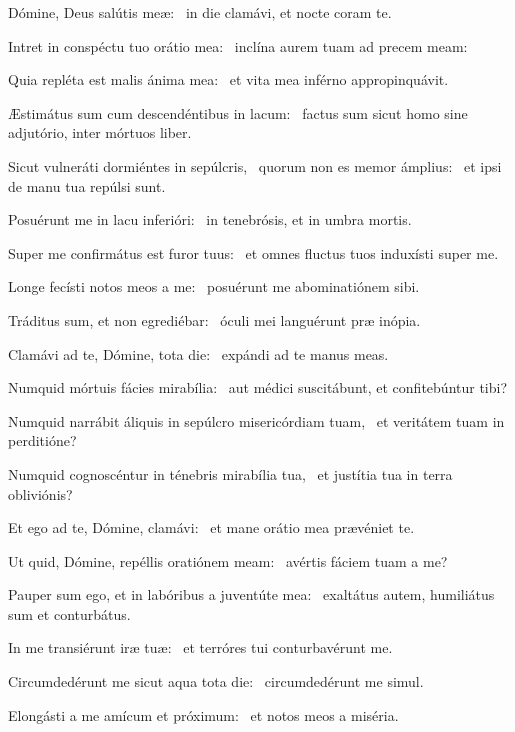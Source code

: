 \item Dómine, Deus salútis meæ:~\psstar{} in die clamávi, et nocte coram te.

\item Intret in conspéctu tuo orátio mea:~\psstar{} inclína aurem tuam ad precem meam:

\item Quia repléta est malis ánima mea:~\psstar{} et vita mea inférno appropinquávit.

\item Æstimátus sum cum descendéntibus in lacum:~\psstar{} factus sum sicut homo sine adjutório, inter mórtuos liber.

\item Sicut vulneráti dormiéntes in sepúlcris,~\pscross{} quorum non es memor ámplius:~\psstar{} et ipsi de manu tua repúlsi sunt.

\item Posuérunt me in lacu inferióri:~\psstar{} in tenebrósis, et in umbra mortis.

\item Super me confirmátus est furor tuus:~\psstar{} et omnes fluctus tuos induxísti super me.

\item Longe fecísti notos meos a me:~\psstar{} posuérunt me abominatiónem sibi.

\item Tráditus sum, et non egrediébar:~\psstar{} óculi mei languérunt præ inópia.

\item Clamávi ad te, Dómine, tota die:~\psstar{} expándi ad te manus meas.

\item Numquid mórtuis fácies mirabília:~\psstar{} aut médici suscitábunt, et confitebúntur tibi?

\item Numquid narrábit áliquis in sepúlcro misericórdiam tuam,~\psstar{} et veritátem tuam in perditióne?

\item Numquid cognoscéntur in ténebris mirabília tua,~\psstar{} et justítia tua in terra obliviónis?

\item Et ego ad te, Dómine, clamávi:~\psstar{} et mane orátio mea prævéniet te.

\item Ut quid, Dómine, repéllis oratiónem meam:~\psstar{} avértis fáciem tuam a me?

\item Pauper sum ego, et in labóribus a juventúte mea:~\psstar{} exaltátus autem, humiliátus sum et conturbátus.

\item In me transiérunt iræ tuæ:~\psstar{} et terróres tui conturbavérunt me.

\item Circumdedérunt me sicut aqua tota die:~\psstar{} circumdedérunt me simul.

\item Elongásti a me amícum et próximum:~\psstar{} et notos meos a miséria.

